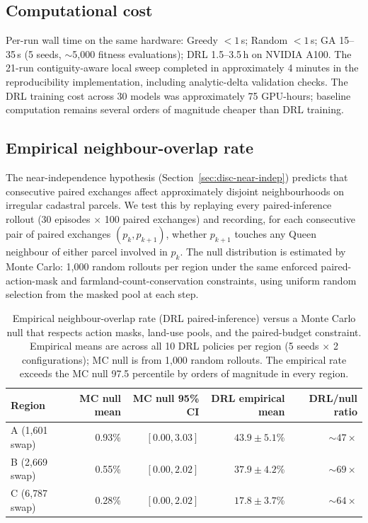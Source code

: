 \documentclass[]{interact}
\theoremstyle{plain}
\begin{document}
\subsection{Computational cost}

Per-run wall time on the same hardware: Greedy $<\!1$\,s; Random $<\!1$\,s; GA 15--35\,s (5 seeds, $\sim$5{,}000 fitness evaluations); DRL 1.5--3.5\,h on NVIDIA A100. The 21-run contiguity-aware local sweep completed in approximately 4 minutes in the reproducibility implementation, including analytic-delta validation checks. The DRL training cost across 30 models was approximately 75 GPU-hours; baseline computation remains several orders of magnitude cheaper than DRL training.

\subsection{Empirical neighbour-overlap rate}\label{sec:results-overlap}

The near-independence hypothesis (Section~\ref{sec:disc-near-indep}) predicts that consecutive paired exchanges affect approximately disjoint neighbourhoods on irregular cadastral parcels. We test this by replaying every paired-inference rollout (30 episodes $\times$ 100 paired exchanges) and recording, for each consecutive pair of paired exchanges $(p_k, p_{k+1})$, whether $p_{k+1}$ touches any Queen neighbour of either parcel involved in $p_k$. The null distribution is estimated by Monte Carlo: 1{,}000 random rollouts per region under the same enforced paired-action-mask and farmland-count-conservation constraints, using uniform random selection from the masked pool at each step.

\begin{table}[htbp]
\centering
\caption{Empirical neighbour-overlap rate (DRL paired-inference) versus a Monte Carlo null that respects action masks, land-use pools, and the paired-budget constraint. Empirical means are across all 10 DRL policies per region (5 seeds $\times$ 2 configurations); MC null is from 1{,}000 random rollouts. The empirical rate exceeds the MC null 97.5 percentile by orders of magnitude in every region.}
\label{tab:overlap}
\begin{tabular}{lrrrr}
\toprule
Region & MC null mean & MC null 95\% CI & DRL empirical mean & DRL/null ratio \\
\midrule
A (1{,}601 swap) & 0.93\% & $[0.00, 3.03]$ & $43.9 \pm 5.1$\% & $\sim 47\times$ \\
B (2{,}669 swap) & 0.55\% & $[0.00, 2.02]$ & $37.9 \pm 4.2$\% & $\sim 69\times$ \\
C (6{,}787 swap) & 0.28\% & $[0.00, 2.02]$ & $17.8 \pm 3.7$\% & $\sim 64\times$ \\
\bottomrule
\end{tabular}
\end{table}
\end{document}
